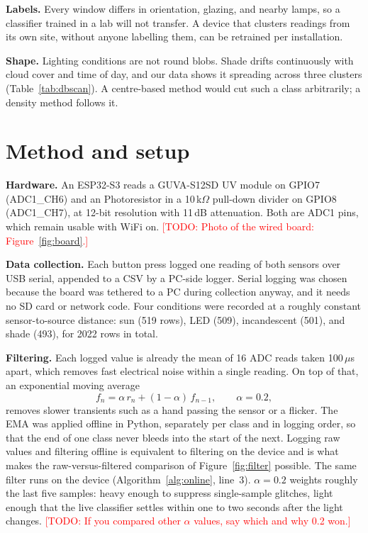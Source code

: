 \documentclass[10pt,a4paper,twocolumn]{article}
\newcommand{\todo}[1]{\textcolor{red}{[TODO: #1]}}
\begin{document}
\textbf{Labels.} Every window differs in orientation, glazing, and nearby lamps, so a
classifier trained in a lab will not transfer. A device that clusters readings from its
own site, without anyone labelling them, can be retrained per installation.

\textbf{Shape.} Lighting conditions are not round blobs. Shade drifts continuously with
cloud cover and time of day, and our data shows it spreading across three clusters
(Table~\ref{tab:dbscan}). A centre-based method would cut such a class arbitrarily;
a density method follows it.

\section{Method and setup}
\label{sec:method}

\textbf{Hardware.} An ESP32-S3 reads a GUVA-S12SD UV module on GPIO7 (ADC1\_CH6) and an
Photoresistor in a 10\,k$\Omega$ pull-down divider on GPIO8 (ADC1\_CH7), at 12-bit
resolution with 11\,dB attenuation. Both are ADC1 pins, which remain usable with WiFi on.
\todo{Photo of the wired board: Figure~\ref{fig:board}.}

\textbf{Data collection.} Each button press logged one reading of both sensors over USB
serial, appended to a CSV by a PC-side logger. Serial logging was chosen because the board
was tethered to a PC during collection anyway, and it needs no SD card or network code.
Four conditions were recorded at a roughly constant sensor-to-source distance: sun
(519 rows), LED (509), incandescent (501), and shade (493), for 2022 rows in total.

\textbf{Filtering.} Each logged value is already the mean of 16 ADC reads taken
100\,$\mu$s apart, which removes fast electrical noise within a single reading.
On top of that, an exponential moving average
\begin{equation}
f_n = \alpha\, r_n + (1-\alpha)\, f_{n-1}, \qquad \alpha = 0.2,
\label{eq:ema}
\end{equation}
removes slower transients such as a hand passing the sensor or a flicker. The EMA was
applied offline in Python, separately per class and in logging order, so that the end of
one class never bleeds into the start of the next. Logging raw values and filtering
offline is equivalent to filtering on the device and is what makes the raw-versus-filtered
comparison of Figure~\ref{fig:filter} possible. The same filter runs on the device
(Algorithm~\ref{alg:online}, line~3). $\alpha=0.2$ weights roughly the last five samples:
heavy enough to suppress single-sample glitches, light enough that the live classifier
settles within one to two seconds after the light changes.
\todo{If you compared other $\alpha$ values, say which and why 0.2 won.}
\end{document}
